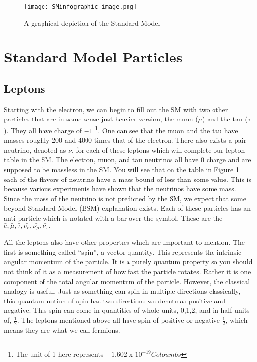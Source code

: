 \begin{figure} %
    \centering
    \texttt{[image: SMinfographic\_image.png]}
    \caption{A graphical depiction of the Standard Model}
    \label{fig:fig_1-2}
 \end{figure}
\section{Standard Model Particles}
\subsection{Leptons}
Starting with the electron, we can begin to fill out the SM with two other particles that are in some sense just heavier version, the muon ($\mu$) and the tau ($\tau$). 
They all have charge of $-1$ \footnote{The unit of 1 here represents $-1.602$ x $ 10^{-19} Coloumbs$ }. One can see that the muon and the tau have masses roughly 200 and 4000 times that of the electron.
There also exists a pair neutrino, denoted as $\nu$, for each of these leptons which will complete our lepton table in the SM. The electron, muon, and tau neutrinos all have 0 charge and are supposed to be massless in the SM.
You will see that on the table in Figure \ref{fig:fig_1-2} each of the flavors of neutrino have a mass bound of less than some value. This is because various experiments have shown that the neutrinos have some mass.
Since the mass of the neutrino is not predicted by the SM, we expect that some beyond Standard Model (BSM) explanation exists. Each of these particles has an anti-particle which is notated with a bar over the symbol. These are the $\bar{e}, \bar{\mu}, \bar{\tau}, \bar{\nu_{e}}, \bar{\nu_{\mu}}, \bar{\nu_{\tau}}.$

All the leptons also have other properties which are important to mention. The first is something called ``spin'', a vector quantity.
This represents the intrinsic angular momentum of the particle. It is a purely quantum property so you should not think of it as a measurement of how fast the particle rotates. 
Rather it is one component of the total angular momentum of the particle. However, the classical analogy is useful. Just as something can spin in multiple directions classically, this quantum notion of spin has two directions we denote as positive and negative.
This spin can come in quantities of whole units, 0,1,2, and in half units of, $\frac{1}{2}$. The leptons mentioned above all have spin of positive or negative $\frac{1}{2}$, which means they are what we call fermions.

